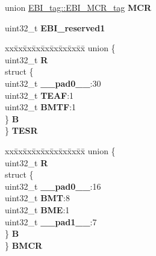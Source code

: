 \begin{DoxyCompactItemize}
\item 
\mbox{\label{structEBI__tag_a7bd66467fe763380e12c77fbfda18cfc}} 
union \mbox{\hyperlink{unionEBI__tag_1_1EBI__MCR__tag}{E\+B\+I\+\_\+tag\+::\+E\+B\+I\+\_\+\+M\+C\+R\+\_\+tag}} {\bfseries M\+CR}
\item 
\mbox{\label{structEBI__tag_a0d0fe12f29d8329f6351187db29f2567}} 
uint32\+\_\+t {\bfseries E\+B\+I\+\_\+reserved1}
\item 
\mbox{\label{structEBI__tag_a4de389ab751deccad1bc65fd901812fb}} 
\begin{tabbing}
xx\=xx\=xx\=xx\=xx\=xx\=xx\=xx\=xx\=\kill
union \{\\
\>uint32\_t {\bfseries R}\\
\>struct \{\\
\>\>uint32\_t {\bfseries \_\_pad0\_\_}:30\\
\>\>uint32\_t {\bfseries TEAF}:1\\
\>\>uint32\_t {\bfseries BMTF}:1\\
\>\} {\bfseries B}\\
\} {\bfseries TESR}\\

\end{tabbing}\item 
\mbox{\label{structEBI__tag_af26882a963696ce2f6c5aa1931c31a70}} 
\begin{tabbing}
xx\=xx\=xx\=xx\=xx\=xx\=xx\=xx\=xx\=\kill
union \{\\
\>uint32\_t {\bfseries R}\\
\>struct \{\\
\>\>uint32\_t {\bfseries \_\_pad0\_\_}:16\\
\>\>uint32\_t {\bfseries BMT}:8\\
\>\>uint32\_t {\bfseries BME}:1\\
\>\>uint32\_t {\bfseries \_\_pad1\_\_}:7\\
\>\} {\bfseries B}\\
\} {\bfseries BMCR}\\


\end{tabbing}
\end{DoxyCompactItemize}
